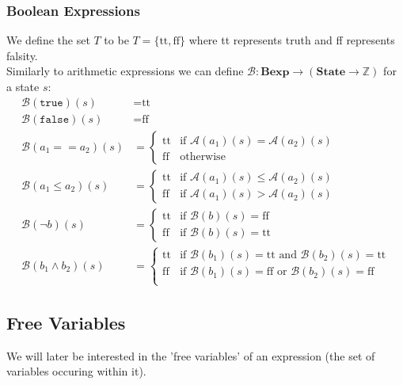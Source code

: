 \documentclass[a4paper, 12pt, twoside]{article}
\begin{document}
\subsubsection{Boolean Expressions}

We define the set $T$ to be $T = \{\text{tt}, \text{ff}\}$ where tt represents
truth and ff represents falsity.
\\[\baselineskip]
Similarly to arithmetic expressions we can define $\mathcal{B} : \textbf{Bexp}
\to (\textbf{State} \to \mathbb{Z})$ for a state $s$: \begin{align*}
  \mathcal{B}(\texttt{true})(s) &= \text{tt} \\
  \mathcal{B}(\texttt{false})(s) &= \text{ff} \\
  \mathcal{B}(a_1 == a_2)(s) &= \begin{cases}
      \text{tt} & \text{if } \mathcal{A}(a_1)(s) = \mathcal{A}(a_2)(s) \\
      \text{ff} & \text{otherwise}
  \end{cases} \\
  \mathcal{B}(a_1 \leq a_2)(s) &= \begin{cases}
    \text{tt} & \text{if } \mathcal{A}(a_1)(s) \leq \mathcal{A}(a_2)(s) \\
    \text{ff} & \text{if } \mathcal{A}(a_1)(s) > \mathcal{A}(a_2)(s)
  \end{cases} \\
  \mathcal{B}(\neg b)(s) &= \begin{cases}
    \text{tt} & \text{if } \mathcal{B}(b)(s) = \text{ff} \\
    \text{ff} & \text{if } \mathcal{B}(b)(s) = \text{tt}
  \end{cases} \\
  \mathcal{B}(b_1 \land b_2)(s) &= \begin{cases}
    \text{tt} & \text{if } \mathcal{B}(b_1)(s) = \text{tt} \text{ and } \mathcal{B}(b_2)(s) = \text{tt} \\
    \text{ff} & \text{if } \mathcal{B}(b_1)(s) = \text{ff} \text{ or } \mathcal{B}(b_2)(s) = \text{ff} \\
  \end{cases}
\end{align*}

\subsection{Free Variables}

We will later be interested in the 'free variables' of an expression 
(the set of variables occuring within it).
\end{document}
